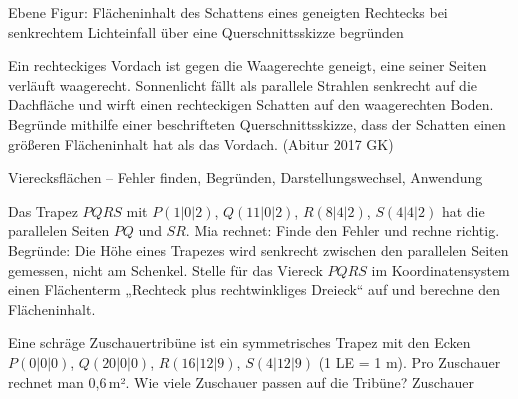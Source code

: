 \begin{aufgabe}{Ebene Figur: Flächeninhalt des Schattens eines geneigten Rechtecks bei senkrechtem Lichteinfall über eine Querschnittsskizze begründen}
\begin{teile}
\teil Ein rechteckiges Vordach ist gegen die Waagerechte geneigt, eine seiner Seiten verläuft waagerecht. Sonnenlicht fällt als parallele Strahlen senkrecht auf die Dachfläche und wirft einen rechteckigen Schatten auf den waagerechten Boden. Begründe mithilfe einer beschrifteten Querschnittsskizze, dass der Schatten einen größeren Flächeninhalt hat als das Vordach. \hfill (Abitur 2017 GK)
\end{teile}
\end{aufgabe}

\begin{aufgabe}{Vierecksflächen – Fehler finden, Begründen, Darstellungswechsel, Anwendung}
\begin{teile}
\teil Das Trapez $PQRS$ mit $P(1 | 0 | 2)$, $Q(11 | 0 | 2)$, $R(8 | 4 | 2)$, $S(4 | 4 | 2)$ hat die parallelen Seiten $PQ$ und $SR$. Mia rechnet:  Finde den Fehler und rechne richtig.
\teil Begründe: Die Höhe eines Trapezes wird senkrecht zwischen den parallelen Seiten gemessen, nicht am Schenkel.
\teil Stelle für das Viereck $PQRS$ im Koordinatensystem einen Flächenterm „Rechteck plus rechtwinkliges Dreieck“ auf und berechne den Flächeninhalt.

\begin{ksys}[xmin=-1,xmax=7,ymin=-1,ymax=6]     \end{ksys}
\teil Eine schräge Zuschauertribüne ist ein symmetrisches Trapez mit den Ecken $P(0 | 0 | 0)$, $Q(20 | 0 | 0)$, $R(16 | 12 | 9)$, $S(4 | 12 | 9)$ (1 LE = 1 m). Pro Zuschauer rechnet man 0{,}6\,m². Wie viele Zuschauer passen auf die Tribüne? \leerfeld Zuschauer
\end{teile}
\end{aufgabe}
